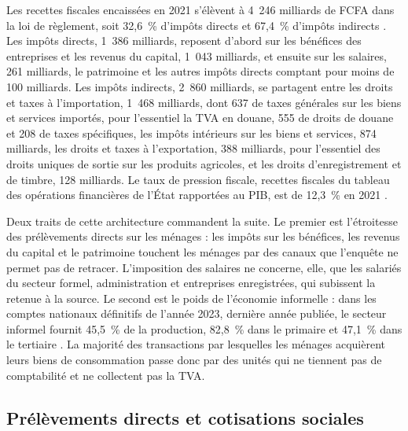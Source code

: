 \documentclass[11pt,a4paper]{article}
\begin{document}
Les recettes fiscales encaissées en 2021 s'élèvent à 4~246 milliards de FCFA
dans la loi de règlement, soit 32,6~\% d'impôts directs et 67,4~\% d'impôts
indirects \citep{civreglement2021}. Les impôts directs, 1~386 milliards,
reposent d'abord sur les bénéfices des entreprises et les revenus du capital,
1~043 milliards, et ensuite sur les salaires, 261 milliards, le patrimoine et les
autres impôts directs comptant pour moins de 100 milliards. Les impôts
indirects, 2~860 milliards, se partagent entre les droits et taxes à
l'importation, 1~468 milliards, dont 637 de taxes générales sur les biens et
services importés, pour l'essentiel la TVA en douane, 555 de droits de douane
et 208 de taxes spécifiques, les impôts intérieurs sur les biens et
services, 874 milliards, les droits et taxes à l'exportation, 388 milliards,
pour l'essentiel des droits uniques de sortie sur les produits agricoles, et les
droits d'enregistrement et de timbre, 128 milliards. Le taux de pression
fiscale, recettes fiscales du tableau des opérations financières de l'État
rapportées au PIB, est de 12,3~\% en 2021 \citep{anstat2023}.

Deux traits de cette architecture commandent la suite. Le premier est
l'étroitesse des prélèvements directs sur les ménages : les impôts sur les
bénéfices, les revenus du capital et le patrimoine touchent les ménages par des
canaux que l'enquête ne permet pas de retracer. L'imposition des salaires ne
concerne, elle, que les salariés du secteur formel, administration et
entreprises enregistrées, qui subissent la retenue à la source. Le second est
le poids de l'économie informelle : dans les comptes nationaux définitifs de
l'année 2023, dernière année publiée, le
secteur informel fournit 45,5~\% de la production, 82,8~\% dans le primaire et
47,1~\% dans le tertiaire \citep{anstatcna2023}. La majorité des transactions
par lesquelles les ménages acquièrent leurs biens de consommation passe donc par
des unités qui ne tiennent pas de comptabilité et ne collectent pas la TVA.

\subsection{Prélèvements directs et cotisations sociales}
\end{document}
